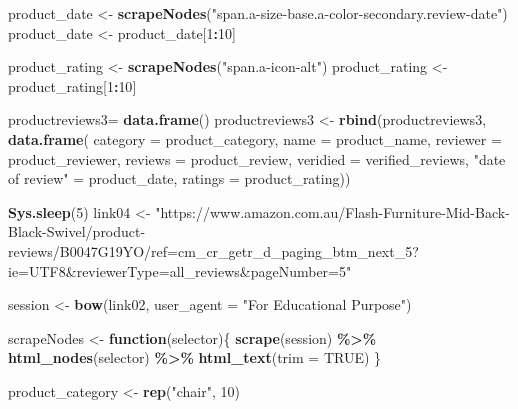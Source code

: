 \documentclass[
]{article}
\newenvironment{Shaded}{\begin{snugshade}}{\end{snugshade}}
\newcommand{\AttributeTok}[1]{\textcolor[rgb]{0.13,0.29,0.53}{#1}}
\newcommand{\ConstantTok}[1]{\textcolor[rgb]{0.56,0.35,0.01}{#1}}
\newcommand{\ControlFlowTok}[1]{\textcolor[rgb]{0.13,0.29,0.53}{\textbf{#1}}}
\newcommand{\DecValTok}[1]{\textcolor[rgb]{0.00,0.00,0.81}{#1}}
\newcommand{\FunctionTok}[1]{\textcolor[rgb]{0.13,0.29,0.53}{\textbf{#1}}}
\newcommand{\NormalTok}[1]{#1}
\newcommand{\OtherTok}[1]{\textcolor[rgb]{0.56,0.35,0.01}{#1}}
\newcommand{\SpecialCharTok}[1]{\textcolor[rgb]{0.81,0.36,0.00}{\textbf{#1}}}
\newcommand{\StringTok}[1]{\textcolor[rgb]{0.31,0.60,0.02}{#1}}
\begin{document}
\begin{Shaded}
\begin{Highlighting}[]
\NormalTok{  product\_date }\OtherTok{\textless{}{-}} \FunctionTok{scrapeNodes}\NormalTok{(}\StringTok{"span.a{-}size{-}base.a{-}color{-}secondary.review{-}date"}\NormalTok{)}
\NormalTok{  product\_date }\OtherTok{\textless{}{-}}\NormalTok{ product\_date[}\DecValTok{1}\SpecialCharTok{:}\DecValTok{10}\NormalTok{]}
  
\NormalTok{  product\_rating }\OtherTok{\textless{}{-}} \FunctionTok{scrapeNodes}\NormalTok{(}\StringTok{"span.a{-}icon{-}alt"}\NormalTok{)}
\NormalTok{  product\_rating }\OtherTok{\textless{}{-}}\NormalTok{ product\_rating[}\DecValTok{1}\SpecialCharTok{:}\DecValTok{10}\NormalTok{]}
  
\NormalTok{  productreviews3}\OtherTok{=} \FunctionTok{data.frame}\NormalTok{()}
\NormalTok{  productreviews3 }\OtherTok{\textless{}{-}} \FunctionTok{rbind}\NormalTok{(productreviews3, }\FunctionTok{data.frame}\NormalTok{(}
                      \AttributeTok{category =}\NormalTok{ product\_category,}
                      \AttributeTok{name =}\NormalTok{ product\_name,}
                      \AttributeTok{reviewer =}\NormalTok{ product\_reviewer,}
                      \AttributeTok{reviews =}\NormalTok{ product\_review,}
                      \AttributeTok{veridied =}\NormalTok{ verified\_reviews,}
                      \StringTok{"date of review"} \OtherTok{=}\NormalTok{ product\_date,}
                      \AttributeTok{ratings =}\NormalTok{ product\_rating))}
  
   \FunctionTok{Sys.sleep}\NormalTok{(}\DecValTok{5}\NormalTok{)}
\NormalTok{link04 }\OtherTok{\textless{}{-}} \StringTok{"https://www.amazon.com.au/Flash{-}Furniture{-}Mid{-}Back{-}Black{-}Swivel/product{-}reviews/B0047G19YO/ref=cm\_cr\_getr\_d\_paging\_btm\_next\_5?ie=UTF8\&reviewerType=all\_reviews\&pageNumber=5"}


\NormalTok{  session }\OtherTok{\textless{}{-}} \FunctionTok{bow}\NormalTok{(link02,}
               \AttributeTok{user\_agent =} \StringTok{"For Educational Purpose"}\NormalTok{)}

\NormalTok{  scrapeNodes }\OtherTok{\textless{}{-}} \ControlFlowTok{function}\NormalTok{(selector)\{}
    \FunctionTok{scrape}\NormalTok{(session) }\SpecialCharTok{\%\textgreater{}\%}
      \FunctionTok{html\_nodes}\NormalTok{(selector) }\SpecialCharTok{\%\textgreater{}\%}
      \FunctionTok{html\_text}\NormalTok{(}\AttributeTok{trim =} \ConstantTok{TRUE}\NormalTok{)}
\NormalTok{  \}}

\NormalTok{  product\_category }\OtherTok{\textless{}{-}} \FunctionTok{rep}\NormalTok{(}\StringTok{"chair"}\NormalTok{, }\DecValTok{10}\NormalTok{)}


\end{Highlighting}
\end{Shaded}
\end{document}
